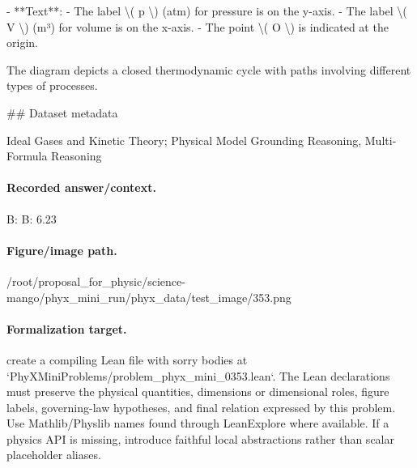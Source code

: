 - **Text**:
  - The label \textbackslash{}( p \textbackslash{}) (atm) for pressure is on the y-axis.
  - The label \textbackslash{}( V \textbackslash{}) (m³) for volume is on the x-axis.
  - The point \textbackslash{}( O \textbackslash{}) is indicated at the origin.

The diagram depicts a closed thermodynamic cycle with paths involving different types of processes.

\#\# Dataset metadata

Ideal Gases and Kinetic Theory; Physical Model Grounding Reasoning, Multi-Formula Reasoning

\paragraph{Recorded answer/context.}
B: B: 6.23

\paragraph{Figure/image path.}
/root/proposal\_for\_physic/science-mango/phyx\_mini\_run/phyx\_data/test\_image/353.png

\paragraph{Formalization target.}
create a compiling Lean file with sorry bodies at `PhyXMiniProblems/problem\_phyx\_mini\_0353.lean`. The Lean declarations must preserve the physical quantities, dimensions or dimensional roles, figure labels, governing-law hypotheses, and final relation expressed by this problem.
Use Mathlib/Physlib names found through LeanExplore where available. If a physics API is missing, introduce faithful local abstractions rather than scalar placeholder aliases.

